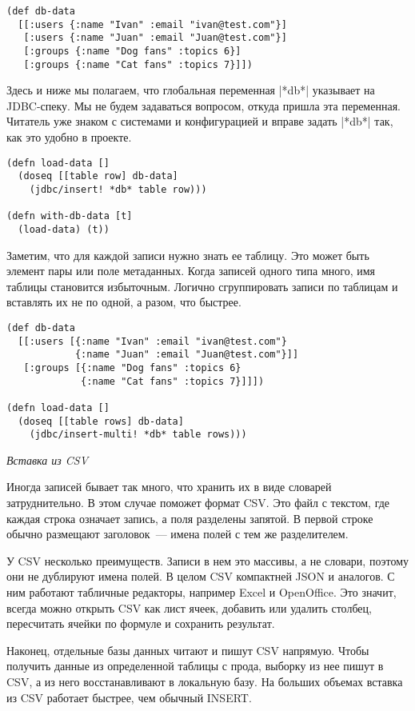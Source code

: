\begin{verbatim}
(def db-data
  [[:users {:name "Ivan" :email "ivan@test.com"}]
   [:users {:name "Juan" :email "Juan@test.com"}]
   [:groups {:name "Dog fans" :topics 6}]
   [:groups {:name "Cat fans" :topics 7}]])
\end{verbatim}

Здесь и ниже мы полагаем, что глобальная переменная \spverb|*db*| указывает на
JDBC-спеку. Мы не будем задаваться вопросом, откуда пришла эта
переменная. Читатель уже знаком с системами и конфигурацией и вправе задать
\spverb|*db*| так, как это удобно в проекте.

\begin{verbatim}
(defn load-data []
  (doseq [[table row] db-data]
    (jdbc/insert! *db* table row)))

(defn with-db-data [t]
  (load-data) (t))
\end{verbatim}

Заметим, что для каждой записи нужно знать ее таблицу. Это может быть элемент
пары или поле метаданных. Когда записей одного типа много, имя таблицы
становится избыточным. Логично сгруппировать записи по таблицам и вставлять их
не по одной, а разом, что быстрее.

\begin{verbatim}
(def db-data
  [[:users [{:name "Ivan" :email "ivan@test.com"}
            {:name "Juan" :email "Juan@test.com"}]]
   [:groups [{:name "Dog fans" :topics 6}
             {:name "Cat fans" :topics 7}]]])

(defn load-data []
  (doseq [[table rows] db-data]
    (jdbc/insert-multi! *db* table rows)))
\end{verbatim}

\emph{Вставка из CSV}

Иногда записей бывает так много, что хранить их в виде словарей
затруднительно. В этом случае поможет формат CSV. Это файл с текстом, где каждая
строка означает запись, а поля разделены запятой. В первой строке обычно
размещают заголовок~--- имена полей с тем же разделителем.

У CSV несколько преимуществ. Записи в нем это массивы, а не словари, поэтому они
не дублируют имена полей. В целом CSV компактней JSON и аналогов. С ним работают
табличные редакторы, например Excel и OpenOffice. Это значит, всегда можно
открыть CSV как лист ячеек, добавить или удалить столбец, пересчитать ячейки по
формуле и сохранить результат.

Наконец, отдельные базы данных читают и пишут CSV напрямую. Чтобы получить
данные из определенной таблицы с прода, выборку из нее пишут в CSV, а из него
восстанавливают в локальную базу. На больших объемах вставка из CSV работает
быстрее, чем обычный INSERT.

